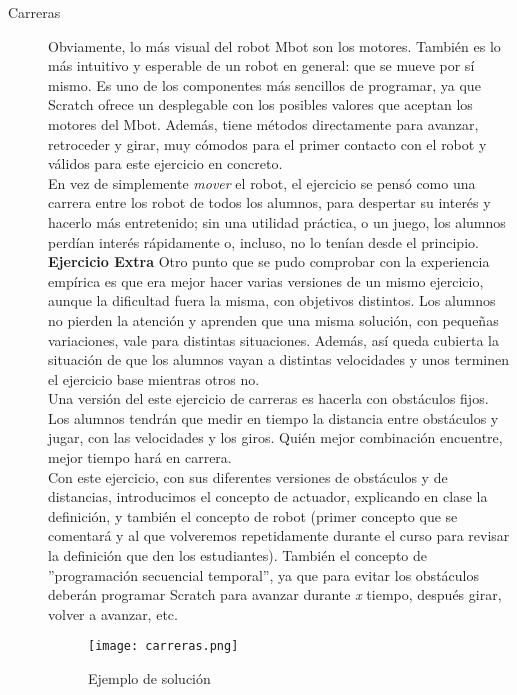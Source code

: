 \begin{description}

\item [Carreras]\label{ej:carreras}
Obviamente, lo más visual del robot Mbot son los motores. También es lo más intuitivo y esperable de un robot en general: que se mueve por sí mismo. Es uno de los componentes más sencillos de programar, ya que Scratch ofrece un desplegable con los posibles valores que aceptan los motores del Mbot. Además, tiene métodos directamente para avanzar, retroceder y girar, muy cómodos para el primer contacto con el robot y válidos para este ejercicio en concreto. \\
En vez de simplemente \textit{mover} el robot, el ejercicio se pensó como una carrera entre los robot de todos los alumnos, para despertar su interés y hacerlo más entretenido; sin una utilidad práctica, o un juego, los alumnos perdían interés rápidamente o, incluso, no lo tenían desde el principio. \\
\textbf{Ejercicio Extra} Otro punto que se pudo comprobar con la experiencia empírica es que era mejor hacer varias versiones de un mismo ejercicio, aunque la dificultad fuera la misma, con objetivos distintos. Los alumnos no pierden la atención y aprenden que una misma solución, con pequeñas variaciones, vale para distintas situaciones. Además, así queda cubierta la situación de que los alumnos vayan a distintas velocidades y unos terminen el ejercicio base mientras otros no.\\
Una versión del este ejercicio de carreras es hacerla con obstáculos fijos. Los alumnos tendrán que medir en tiempo la distancia entre obstáculos y jugar, con las velocidades y los giros. Quién mejor combinación encuentre, mejor tiempo hará en carrera.\\
Con este ejercicio, con sus diferentes versiones de obstáculos y de distancias, introducimos el concepto de actuador, explicando en clase la definición, y también el concepto de robot (primer concepto que se comentará y al que volveremos repetidamente durante el curso para revisar la definición que den los estudiantes). También el concepto de ''programación secuencial temporal'', ya que para evitar los obstáculos deberán programar Scratch para avanzar durante \textit{x} tiempo, después girar, volver a avanzar, etc.
\begin{figure}[h]
	\centering
	\texttt{[image: carreras.png]}
	\label{img:carreras}
	\caption{Ejemplo de solución}
\end{figure}


\end{description}
